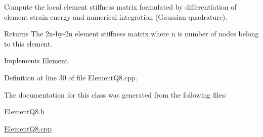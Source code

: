 Compute the local element stiffness matrix formulated by differentiation of element strain energy and numerical integration (Gaussian quadrature). 

\begin{DoxyReturn}{Returns}
The 2n-\/by-\/2n element stiffness matrix where n is number of nodes belong to this element. 
\end{DoxyReturn}


Implements \mbox{\hyperlink{class_element_a603fbe060b5d6979506f0d2130e6c171}{Element}}.



Definition at line 30 of file Element\+Q8.\+cpp.



The documentation for this class was generated from the following files\+:\begin{DoxyCompactItemize}
\item 
\mbox{\hyperlink{_element_q8_8h}{Element\+Q8.\+h}}\item 
\mbox{\hyperlink{_element_q8_8cpp}{Element\+Q8.\+cpp}}\end{DoxyCompactItemize}
